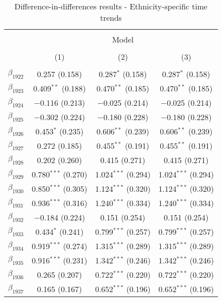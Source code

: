 
\begin{table}[!h] \centering 
  \caption{Difference-in-differences results - Ethnicity-specific time trends} 
  \label{dif_table_trends} 
\small 
\begin{tabular}{@{\extracolsep{5pt}}lccc} 
\\[-1.8ex]\hline 
\hline \\[-1.8ex] 
 & \multicolumn{3}{c}{Model} \\ 
\cline{2-4} 
\\[-1.8ex] & (1) & (2) & (3)\\ 
\hline \\[-1.8ex] 
 $\beta_{1922}$ & 0.257 (0.158) & 0.287$^{*}$ (0.158) & 0.287$^{*}$ (0.158) \\ 
  $\beta_{1923}$ & 0.409$^{**}$ (0.188) & 0.470$^{**}$ (0.185) & 0.470$^{**}$ (0.185) \\ 
  $\beta_{1924}$ & $-$0.116 (0.213) & $-$0.025 (0.214) & $-$0.025 (0.214) \\ 
  $\beta_{1925}$ & $-$0.302 (0.224) & $-$0.180 (0.228) & $-$0.180 (0.228) \\ 
  $\beta_{1926}$ & 0.453$^{*}$ (0.235) & 0.606$^{**}$ (0.239) & 0.606$^{**}$ (0.239) \\ 
  $\beta_{1927}$ & 0.272 (0.185) & 0.455$^{**}$ (0.191) & 0.455$^{**}$ (0.191) \\ 
  $\beta_{1928}$ & 0.202 (0.260) & 0.415 (0.271) & 0.415 (0.271) \\ 
  $\beta_{1929}$ & 0.780$^{***}$ (0.270) & 1.024$^{***}$ (0.294) & 1.024$^{***}$ (0.294) \\ 
  $\beta_{1930}$ & 0.850$^{***}$ (0.305) & 1.124$^{***}$ (0.320) & 1.124$^{***}$ (0.320) \\ 
  $\beta_{1931}$ & 0.936$^{***}$ (0.316) & 1.240$^{***}$ (0.334) & 1.240$^{***}$ (0.334) \\ 
  $\beta_{1932}$ & $-$0.184 (0.224) & 0.151 (0.254) & 0.151 (0.254) \\ 
  $\beta_{1933}$ & 0.434$^{*}$ (0.241) & 0.799$^{***}$ (0.257) & 0.799$^{***}$ (0.257) \\ 
  $\beta_{1934}$ & 0.919$^{***}$ (0.274) & 1.315$^{***}$ (0.289) & 1.315$^{***}$ (0.289) \\ 
  $\beta_{1935}$ & 0.916$^{***}$ (0.231) & 1.342$^{***}$ (0.246) & 1.342$^{***}$ (0.246) \\ 
  $\beta_{1936}$ & 0.265 (0.207) & 0.722$^{***}$ (0.220) & 0.722$^{***}$ (0.220) \\ 
  $\beta_{1937}$ & 0.165 (0.167) & 0.652$^{***}$ (0.196) & 0.652$^{***}$ (0.196) \\ 

\end{tabular}
\end{table}
